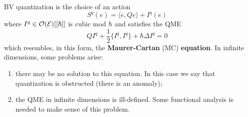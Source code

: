 BV quantization is the choice of an action
\begin{equation*}
  S^q(e) = \langle e, Qe \rangle
  + I^q(e)
\end{equation*}
where $I^q \in \mathcal{O}(\mathcal{E}) [[\hbar]]$ is cubic mod $\hbar$ and satisfies the QME
\begin{equation*}
  Q I^q + \frac{1}{2} \{I^q, I^q\} + \hbar \Delta I^q = 0
\end{equation*}
which resembles, in this form, the \textbf{Maurer-Cartan} (MC) \textbf{equation}. In infinite dimensions, some problems arise:

\begin{enumerate}
  \item there may be no solution to this equation. In this case we say that quantization is obstructed (there is an anomaly);
  \item the QME in infinite dimensions is ill-defined. Some functional analysis is needed to make sense of this problem.
\end{enumerate}
